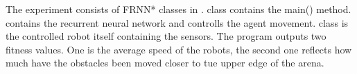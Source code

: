The experiment consists of FRNN* classes in .  class contains the main() method.  contains the recurrent neural network and controlls the agent movement.  class is the controlled robot itself containing the sensors. The program outputs two fitness values. One is the average speed of the robots, the second one reflects how much have the obstacles been moved closer to tue upper edge of the arena.

